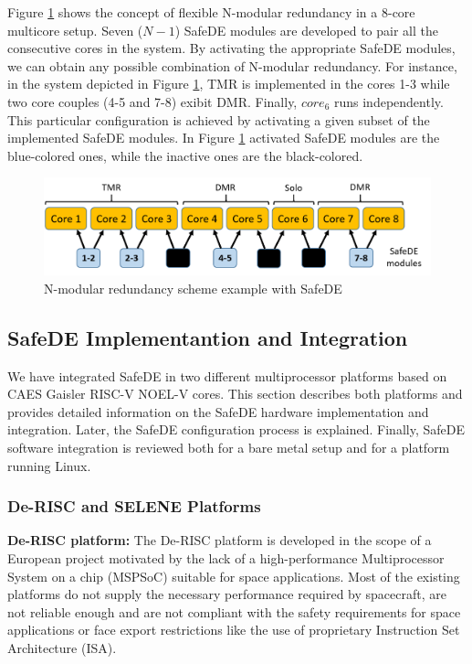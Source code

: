 Figure \ref{fig:N_modular_redundancy} shows the concept of flexible N-modular redundancy in a 8-core multicore setup. Seven ($N-1$) SafeDE modules are developed to pair all the consecutive cores in the system. By activating the appropriate SafeDE modules, we can obtain any possible combination of N-modular redundancy. For instance, in the system depicted in Figure \ref{fig:N_modular_redundancy}, TMR is implemented in the cores 1-3 while two core couples (4-5 and 7-8) exibit DMR. Finally, $core_6$ runs independently. This particular configuration is achieved by activating a given subset of the implemented SafeDE modules. In Figure \ref{fig:N_modular_redundancy} activated SafeDE modules are the blue-colored ones, while the inactive ones are the black-colored.


\begin{figure}[h]
    \centering
    \includegraphics[scale=0.75]{img/Nmodular.png}
    \caption{N-modular redundancy scheme example with SafeDE}
    \label{fig:N_modular_redundancy}
\end{figure}

\bigskip



\subsection{SafeDE Implementantion and Integration}

We have integrated SafeDE in two different multiprocessor platforms based on CAES Gaisler RISC-V NOEL-V cores. This section describes both platforms and provides detailed information on the SafeDE hardware implementation and integration. Later, the SafeDE configuration process is explained. Finally, SafeDE software integration is reviewed both for a bare metal setup and for a platform running Linux.    


\subsubsection{De-RISC and SELENE Platforms}

\textbf{De-RISC platform:} The De-RISC platform \cite{gomez2020risc} is developed in the scope of a European project motivated by the lack of a high-performance Multiprocessor System on a chip (MSPSoC) suitable for space applications. Most of the existing platforms do not supply the necessary performance required by spacecraft, are not reliable enough and are not compliant with the safety requirements for space applications or face export restrictions like the use of proprietary Instruction Set Architecture (ISA). 

